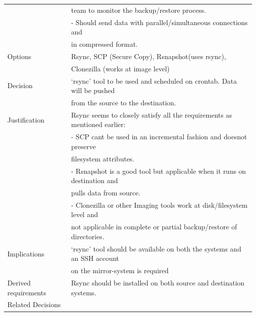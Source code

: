 \documentclass[11pt]{article}
\begin{document}
\begin{table}[H]
\begin{center}
\begin{tabular}{ll}
                         &  team to monitor the backup/restore process.                                \\
                         &  - Should send data with parallel/simultaneous connections and              \\
                         &  in compressed format.                                                      \\
 Options                 &  Rsync, SCP (Secure Copy), Rsnapshot(uses rsync),                           \\
                         &  Clonezilla (works at image level)                                          \\
 Decision                &  `rsync' tool to be used and scheduled on crontab. Data will be pushed      \\
                         &  from the source to the destination.                                        \\
 Justification           &  Rsync seems to closely satisfy all the requirements as mentioned earlier:  \\
                         &  - SCP cant be used in an incremental fashion and doesnot preserve          \\
                         &  filesystem attributes.                                                     \\
                         &  - Rsnapshot is a good tool but applicable when it runs on destination and  \\
                         &  pulls data from source.                                                    \\
                         &  - Clonezilla or other Imaging tools work at disk/filesystem level and      \\
                         &  not applicable in complete or partial backup/restore of directories.       \\
 Implications            &  `rsync' tool should be available on both the systems and an SSH account    \\
                         &  on the mirror-system is required                                           \\
 Derived requirements    &  Rsync should be installed on both source and destination systems.          \\
 Related Decisions       &                                                                             \\
\hline
\end{tabular}
\end{center}
\end{table}
\end{document}
